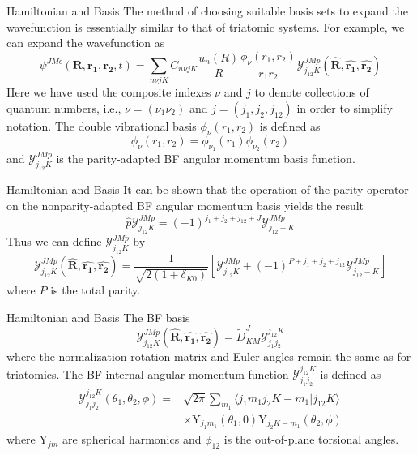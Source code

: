 \documentclass{beamer}
\begin{document}
	\begin{frame}{Hamiltonian and Basis}
		The method of choosing suitable basis sets to expand the wavefunction is essentially similar to that of triatomic systems. For example, we can expand the wavefunction as
		\begin{equation}
			\psi^{JM\epsilon}(\mathbf{R},\mathbf{r_1},\mathbf{r_2},t)=\sum\limits_{n\nu jK}C_{n\nu jK}\dfrac{u_n(R)}{R}\dfrac{\phi_\nu(r_1,r_2)}{r_1r_2}\mathcal{Y}^{JMp}_{j_{12}K}(\hat{\mathbf{R}},\hat{\mathbf{r_1}},\hat{\mathbf{r_2}})
		\end{equation}
		Here we have used the composite indexes $\nu$ and $j$ to denote collections of quantum numbers, i.e., $\nu=(\nu_1\nu_2)$ and $j=(j_1,j_2,j_{12})$ in order to simplify notation. The double vibrational basis $\phi_\nu(r_1,r_2)$ is defined as
		\begin{equation}
			\phi_\nu(r_1,r_2)=\phi_{\nu_1}(r_1)\phi_{\nu_2}(r_2)
		\end{equation}
		and $\mathcal{Y}^{JMp}_{j_{12}K}$ is the parity-adapted BF angular momentum basis function.
	\end{frame}
	\begin{frame}{Hamiltonian and Basis}
		It can be shown that the operation of the parity operator on the nonparity-adapted BF angular momentum basis yields the result
		\begin{equation}
			\hat{p}\mathcal{Y}^{JMp}_{j_{12}K}=(-1)^{j_1+j_2+j_{12}+J}\mathcal{Y}^{JMp}_{j_{12}-K}
		\end{equation}
		Thus we can define $\mathcal{Y}^{JMp}_{j_{12}K}$ by
		\begin{equation}
			\mathcal{Y}^{JMp}_{j_{12}K}(\hat{\mathbf{R}},\hat{\mathbf{r_1}},\hat{\mathbf{r_2}})=\dfrac{1}{\sqrt{2(1+\delta_{K0})}}\left[ \mathcal{Y}^{JMp}_{j_{12}K}+(-1)^{P+j_1+j_2+j_{12}}\mathcal{Y}^{JMp}_{j_{12}-K}\right] 
		\end{equation}
		where $P$ is the total parity.
	\end{frame}
	\begin{frame}{Hamiltonian and Basis}
		The BF basis
		\begin{equation}
			\mathcal{Y}^{JMp}_{j_{12}K}(\hat{\mathbf{R}},\hat{\mathbf{r_1}},\hat{\mathbf{r_2}})=\widetilde{D}^J_{KM}\mathcal{Y}^{j_{12}K}_{j_1j_2}
		\end{equation}
		where the normalization rotation matrix and Euler angles remain the same as for triatomics. The BF internal angular momentum function $\mathcal{Y}^{j_{12}K}_{j_1j_2}$ is defined as
		\begin{align}
			\mathcal{Y}^{j_{12}K}_{j_1j_2}(\theta_1,\theta_2,\phi)=&\sqrt{2\pi}\sum\limits_{m_1}\langle j_1m_1j_2K-m_1|j_{12}K\rangle\nonumber\\
			&\times\mathrm{Y}_{j_1m_1}(\theta_1,0)\mathrm{Y}_{j_2K-m_1}(\theta_2,\phi)
		\end{align}
		where $\mathrm{Y}_{jm}$ are spherical harmonics and $\phi_{12}$ is the out-of-plane torsional angles.
	\end{frame}
\end{document}
